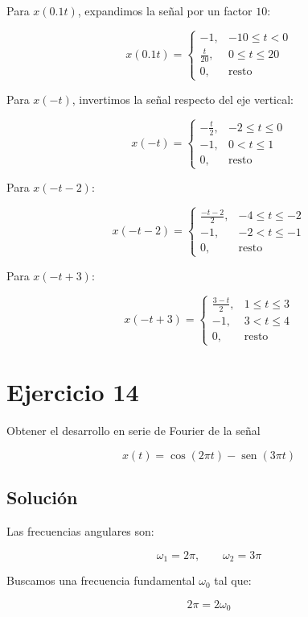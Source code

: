 \documentclass[fleqn]{article}
\DeclareMathOperator{\sen}{sen}
\begin{document}
	Para $x(0.1t)$, expandimos la señal por un factor $10$:

	\[
	\boxed{
	x(0.1t)=
	\begin{cases}
	-1, & -10\leq t<0 \\[1mm]
	\displaystyle\frac{t}{20}, & 0\leq t\leq20 \\[1mm]
	0, & \text{resto}
	\end{cases}
	}
	\]

	Para $x(-t)$, invertimos la señal respecto del eje vertical:

	\[
	\boxed{
	x(-t)=
	\begin{cases}
	\displaystyle-\frac{t}{2}, & -2\leq t\leq0 \\[1mm]
	-1, & 0<t\leq1 \\[1mm]
	0, & \text{resto}
	\end{cases}
	}
	\]

	Para $x(-t-2)$:

	\[
	\boxed{
	x(-t-2)=
	\begin{cases}
	\displaystyle\frac{-t-2}{2}, & -4\leq t\leq-2 \\[1mm]
	-1, & -2<t\leq-1 \\[1mm]
	0, & \text{resto}
	\end{cases}
	}
	\]

	Para $x(-t+3)$:

	\[
	\boxed{
	x(-t+3)=
	\begin{cases}
	\displaystyle\frac{3-t}{2}, & 1\leq t\leq3 \\[1mm]
	-1, & 3<t\leq4 \\[1mm]
	0, & \text{resto}
	\end{cases}
	}
	\]

\section{Ejercicio 14}
	Obtener el desarrollo en serie de Fourier de la señal

	\[
	x(t)=\cos(2\pi t)-\sen(3\pi t)
	\]

	\subsection{Solución}

	Las frecuencias angulares son:

	\[
	\omega_1=2\pi,
	\qquad
	\omega_2=3\pi
	\]

	Buscamos una frecuencia fundamental $\omega_0$ tal que:

	\[
	2\pi=2\omega_0
	\]
\end{document}
